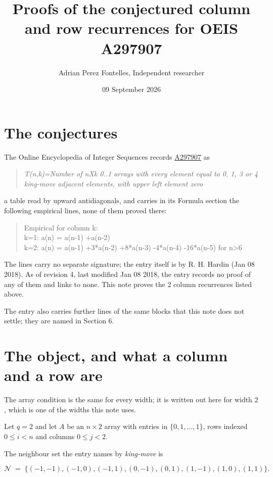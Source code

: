 \documentclass[11pt]{article}
\title{Proofs of the conjectured column and row recurrences for OEIS A297907}
\author{Adrian Perez Fontelles, Independent researcher}
\date{09 September 2026}
\theoremstyle{definition}
\begin{document}
\maketitle
\section{The conjectures}

The Online Encyclopedia of Integer Sequences records \href{https://oeis.org/A297907}{A297907} as

\begin{quote}\itshape T(n,k)=Number of nXk 0..1 arrays with every element equal to 0, 1, 3 or 4 king-move adjacent elements, with upper left element zero\end{quote}

a table read by upward antidiagonals, and carries in its Formula section the following empirical lines, none of them proved there:

\begin{quote}\ttfamily Empirical for column k:\\
k=1: a(n) = a(n-1) +a(n-2)\\k=2: a(n) = a(n-1) +3*a(n-2) +8*a(n-3) -4*a(n-4) -16*a(n-5) for n>6\end{quote}

The lines carry no separate signature; the entry itself is by R. H. Hardin (Jan 08 2018). As of revision 4, last modified Jan 08 2018, the entry records no proof of any of them and links to none. This note proves the 2 column recurrences listed above.

The entry also carries further lines of the same blocks that this note does not settle; they are named in Section 6.

\section{The object, and what a column and a row are}

The array condition is the same for every width; it is written out here for width $2$, which is one of the widths this note uses.

Let $q = 2$ and let $A$ be an $n \times 2$ array with entries in $\{0,1,\dots,1\}$, rows indexed $0 \le i < n$ and columns $0 \le j < 2$.

The neighbour set the entry names by {\itshape king-move} is

\[\mathcal{N} \;=\; \{(-1,-1), (-1,0), (-1,1), (0,-1), (0,1), (1,-1), (1,0), (1,1)\}.\]
\end{document}
